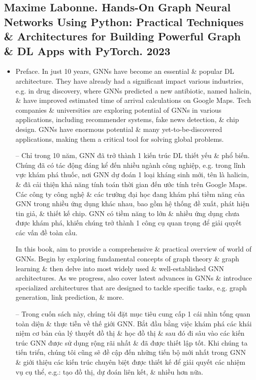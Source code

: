 \documentclass{article}
\begin{document}

\subsection{{\sc Maxime Labonne}. Hands-On Graph Neural Networks Using Python: Practical Techniques \& Architectures for Building Powerful Graph \& DL Apps with PyTorch. 2023}

\begin{itemize}
    \item {\sf Preface.} In just 10 years, GNNs have become an essential \& popular DL architecture. They have already had a significant impact various industries, e.g. in drug discovery, where GNNs predicted a new antibiotic, named halicin, \& have improved estimated time of arrival calculations on Google Maps. Tech companies \& universities are exploring potential of GNNs in various applications, including recommender systems, fake news detection, \& chip design. GNNs have enormous potential \& many yet-to-be-discovered applications, making them a critical tool for solving global problems.

    -- Chỉ trong 10 năm, GNN đã trở thành 1 kiến trúc DL thiết yếu \& phổ biến. Chúng đã có tác động đáng kể đến nhiều ngành công nghiệp, e.g. trong lĩnh vực khám phá thuốc, nơi GNN dự đoán 1 loại kháng sinh mới, tên là halicin, \& đã cải thiện khả năng tính toán thời gian đến ước tính trên Google Maps. Các công ty công nghệ \& các trường đại học đang khám phá tiềm năng của GNN trong nhiều ứng dụng khác nhau, bao gồm hệ thống đề xuất, phát hiện tin giả, \& thiết kế chip. GNN có tiềm năng to lớn \& nhiều ứng dụng chưa được khám phá, khiến chúng trở thành 1 công cụ quan trọng để giải quyết các vấn đề toàn cầu.

    In this book, aim to provide a comprehensive \& practical overview of world of GNNs. Begin by exploring fundamental concepts of graph theory \& graph learning \& then delve into most widely used \& well-established GNN architectures. As we progress, also cover latest advances in GNNs \& introduce specialized architectures that are designed to tackle specific tasks, e.g. graph generation, link prediction, \& more.

    -- Trong cuốn sách này, chúng tôi đặt mục tiêu cung cấp 1 cái nhìn tổng quan toàn diện \& thực tiễn về thế giới GNN. Bắt đầu bằng việc khám phá các khái niệm cơ bản của lý thuyết đồ thị \& học đồ thị \& sau đó đi sâu vào các kiến trúc GNN được sử dụng rộng rãi nhất \& đã được thiết lập tốt. Khi chúng ta tiến triển, chúng tôi cũng sẽ đề cập đến những tiến bộ mới nhất trong GNN \& giới thiệu các kiến trúc chuyên biệt được thiết kế để giải quyết các nhiệm vụ cụ thể, e.g.: tạo đồ thị, dự đoán liên kết, \& nhiều hơn nữa.


\end{itemize}
\end{document}
